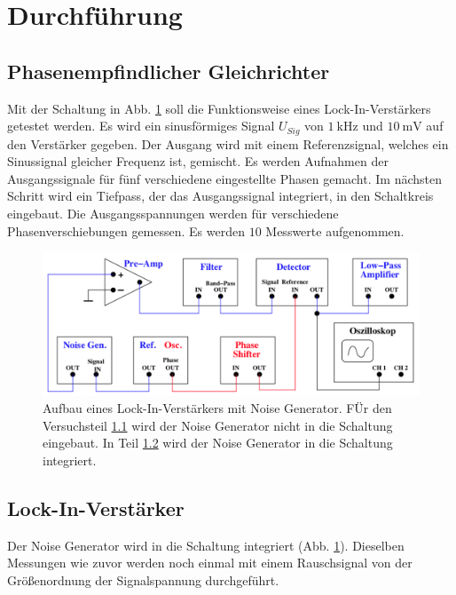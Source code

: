 \section{Durchführung}
\label{sec:Durchführung}



\subsection{Phasenempfindlicher Gleichrichter} %
\label{sec:eins}
Mit der Schaltung in Abb. \ref{lockin2} soll die Funktionsweise eines Lock-In-Verstärkers getestet werden.
Es wird ein sinusförmiges Signal $U_{Sig}$ von $\SI{1}{\kilo\hertz}$ und 
$\SI{10}{\milli\volt}$ auf den Verstärker gegeben.
Der Ausgang wird mit einem Referenzsignal, welches ein Sinussignal gleicher Frequenz ist, gemischt.
Es werden Aufnahmen der Ausgangssignale für fünf verschiedene eingestellte Phasen gemacht.
\newline
Im nächsten Schritt wird ein Tiefpass, der das Ausgangssignal integriert, 
in den Schaltkreis eingebaut. %
Die Ausgangsspannungen werden für verschiedene Phasenverschiebungen gemessen.
Es werden $\num{10}$ Messwerte aufgenommen. %
\begin{figure}
    \centering
    \includegraphics{build/lockin2.png}
    \caption{Aufbau eines Lock-In-Verstärkers mit Noise Generator.
    FÜr den Versuchsteil \ref{sec:eins} wird der Noise Generator nicht in die 
    Schaltung eingebaut. In Teil \ref{sec:zwei} wird der Noise Generator in die 
    Schaltung integriert.}
    \label{lockin2}
\end{figure}

\subsection{Lock-In-Verstärker} %
\label{sec:zwei}
Der Noise Generator wird in die Schaltung integriert (Abb. \ref{lockin2}).
Dieselben Messungen wie zuvor werden noch einmal mit einem Rauschsignal von der Größenordnung der Signalspannung 
durchgeführt.

